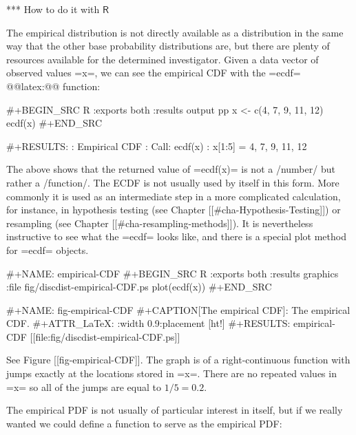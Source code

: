 *** How to do it with \(\mathsf{R}\)

The empirical distribution is not directly available as a distribution
in the same way that the other base probability distributions are, but
there are plenty of resources available for the determined
investigator.  Given a data vector of observed values =x=, we can see
the empirical CDF with the =ecdf= @@latex:@@ function:

#+BEGIN_SRC R :exports both :results output pp  
x <- c(4, 7, 9, 11, 12)
ecdf(x)
#+END_SRC

#+RESULTS:
: Empirical CDF 
: Call: ecdf(x)
:  x[1:5] =      4,      7,      9,     11,     12

The above shows that the returned value of =ecdf(x)= is not a /number/
but rather a /function/. The ECDF is not usually used by itself in
this form. More commonly it is used as an intermediate step in a more
complicated calculation, for instance, in hypothesis testing (see
Chapter [[#cha-Hypothesis-Testing]]) or resampling (see Chapter
[[#cha-resampling-methods]]). It is nevertheless instructive to see
what the =ecdf= looks like, and there is a special plot method for
=ecdf= objects.

#+NAME: empirical-CDF
#+BEGIN_SRC R :exports both :results graphics :file fig/discdist-empirical-CDF.ps
plot(ecdf(x))
#+END_SRC

#+NAME: fig-empirical-CDF
#+CAPTION[The empirical CDF]: \small The empirical CDF. 
#+ATTR_LaTeX: :width 0.9\textwidth :placement [ht!]
#+RESULTS: empirical-CDF
[[file:fig/discdist-empirical-CDF.ps]]

See Figure [[fig-empirical-CDF]]. The graph is of a right-continuous function
with jumps exactly at the locations stored in =x=. There are no
repeated values in =x= so all of the jumps are equal to \(1/5=0.2\).

The empirical PDF is not usually of particular interest in itself, but
if we really wanted we could define a function to serve as the
empirical PDF:

